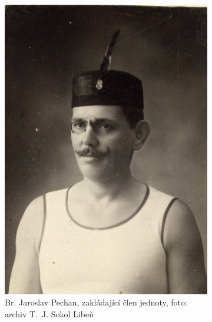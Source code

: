 \documentclass[a5paper, 11pt, twoside]{article}
\begin{document}
\begin{figure}[h]
  \centering
  \begin{subfigure}{0.45\textwidth}
   \includegraphics[width=\textwidth]{img/01_pechan.jpg}
  \caption*{Br. Jaroslav Pechan, zakládající člen jednoty, foto: archiv T.~J. Sokol Libeň}
  \end{subfigure}
  \hfill
  \begin{subfigure}{0.45\textwidth}

\end{subfigure}
\end{figure}
\end{document}
